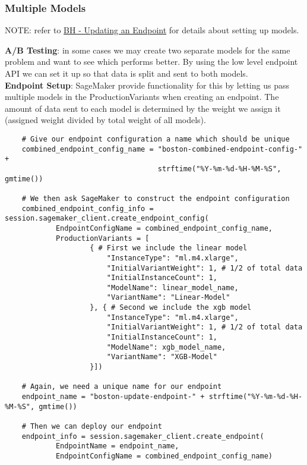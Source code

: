 \documentclass[11pt, a4paper]{article}
\begin{document}
\begin{spacing}{1.1}
	\subsubsection{Multiple Models}
	\begin{center}
	\color{darkgray} NOTE: refer to \href{file:///E:/Documents/UdacityNotes/ML\%20Engineer/sample\_code/BH\%20-\%20Updating\%20an\%20Endpoint.html}{BH - Updating an Endpoint} for details about setting up models. \color{black}
	\end{center} \vspace*{1mm}
	\textbf{A/B Testing}: in some cases we may create two separate models for the same problem and want to see which performs better. By using the low level endpoint API we can set it up so that data is split and sent to both models. \vspace*{2mm}\\
	\textbf{Endpoint Setup}: SageMaker provide functionality for this by letting us pass multiple models in the ProductionVariants when creating an endpoint. The amount of data sent to each model is determined by the weight we assign it (assigned weight divided by total weight of all models).
	\begin{lstlisting}
	# Give our endpoint configuration a name which should be unique
	combined_endpoint_config_name = "boston-combined-endpoint-config-" + 
	                                strftime("%Y-%m-%d-%H-%M-%S", gmtime())
	
	# We then ask SageMaker to construct the endpoint configuration
	combined_endpoint_config_info = session.sagemaker_client.create_endpoint_config(
			EndpointConfigName = combined_endpoint_config_name,
			ProductionVariants = [
					{ # First we include the linear model
						"InstanceType": "ml.m4.xlarge",
						"InitialVariantWeight": 1, # 1/2 of total data
						"InitialInstanceCount": 1,
						"ModelName": linear_model_name,
						"VariantName": "Linear-Model"
					}, { # Second we include the xgb model
						"InstanceType": "ml.m4.xlarge",
						"InitialVariantWeight": 1, # 1/2 of total data
						"InitialInstanceCount": 1,
						"ModelName": xgb_model_name,
						"VariantName": "XGB-Model"
					}])
	
	# Again, we need a unique name for our endpoint
	endpoint_name = "boston-update-endpoint-" + strftime("%Y-%m-%d-%H-%M-%S", gmtime())
	
	# Then we can deploy our endpoint
	endpoint_info = session.sagemaker_client.create_endpoint(
			EndpointName = endpoint_name,
			EndpointConfigName = combined_endpoint_config_name)
	

\end{lstlisting}
\end{spacing}
\end{document}
